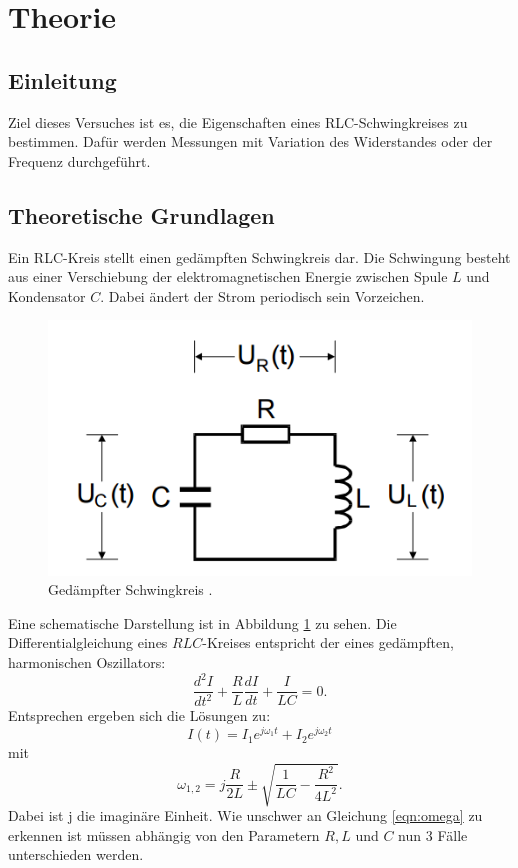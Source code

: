 \section{Theorie}
\label{sec:Theorie}

\subsection{Einleitung}
Ziel dieses Versuches ist es, die Eigenschaften eines RLC-Schwingkreises
zu bestimmen. Dafür werden Messungen mit Variation des Widerstandes oder der
Frequenz durchgeführt.

\subsection{Theoretische Grundlagen}
Ein RLC-Kreis stellt einen gedämpften Schwingkreis dar. Die Schwingung besteht
aus einer Verschiebung der elektromagnetischen Energie zwischen
Spule $L$ und Kondensator $C$.
Dabei ändert der Strom periodisch sein
Vorzeichen.
\begin{figure}
  \centering
  \includegraphics{schwingkreis.png}
  \caption{Gedämpfter Schwingkreis \cite{officialmanual}.}
  \label{fig:RLC}
\end{figure}
Eine schematische Darstellung ist in Abbildung \ref{fig:RLC} zu sehen.
Die Differentialgleichung eines $RLC$-Kreises entspricht der eines
gedämpften, harmonischen
Oszillators:
\begin{equation}
   \frac{d^2I}{dt^2} + \frac{R}{L} \frac{dI}{dt} + \frac{I}{LC} = 0.
   \label{eqn:dgl}
\end{equation}
Entsprechen ergeben sich die Lösungen zu:
\begin{equation}
  I(t) = I_1 e^{j\omega_1t} + I_2 e^{j\omega_2t}
  \label{eqn:I}
\end{equation}
  mit
\begin{equation}
  \omega_{1,2} = j\frac{R}{2L} \pm \sqrt{\frac{1}{LC} - \frac{R^2}{4L^2}}.
  \label{eqn:omega}
\end{equation}
Dabei ist j die imaginäre Einheit.
Wie unschwer an Gleichung \ref{eqn:omega} zu erkennen ist müssen abhängig von
den Parametern $R, L$ und $C$ nun 3 Fälle unterschieden werden.

